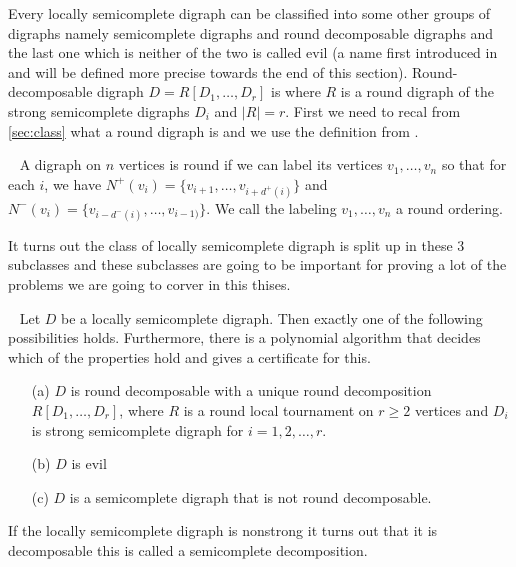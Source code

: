 
Every locally semicomplete digraph can be classified into some other groups of digraphs namely semicomplete digraphs and round decomposable digraphs and the last one which is neither of the two is called evil (a name first introduced in \cite{bangJGT85} and will be defined more precise towards the end of this section). 
Round-decomposable digraph $D=R[D_1,\dots,D_r]$ is where $R$ is a round digraph of the strong semicomplete digraphs $D_i$ and $|R|=r$.
First we need to recal from \autoref{sec:class} what a round digraph is and we use the definition from \cite{bangJGT77}.
\begin{definition}~\cite{bangJGT77}
    A digraph on $n$ vertices is round if we can label its vertices $v_1,\dots ,v_n$ so that for each $i$, we have $N^+(v_i)=\lbrace v_{i+1},\dots ,v_{i+d^+(i)}\rbrace$ and $N^-(v_i)=\lbrace v_{i-d^-(i)},\dots ,v_{i-1)}\rbrace$. We call the labeling $v_1,\dots ,v_n$ a round ordering. 
\end{definition}
It turns out the class of locally semicomplete digraph is split up in these 3 subclasses and these subclasses are going to be important for proving a lot of the problems we are going to corver in this thises.
\begin{thm}~\cite{bangDM167,bangJGT85}
    Let $D$ be a locally semicomplete digraph. Then exactly one of the following possibilities holds. Furthermore, there is a polynomial algorithm that decides which of the properties hold and gives a certificate for this.
    \begin{itemize}
        \item[(a)] $D$ is round decomposable with a unique round decomposition $R[D_1,\dots ,D_r]$, where $R$ is a round local tournament on $r\geq 2$ vertices and $D_i$ is strong semicomplete digraph for $i=1,2,\dots,r$.
        \item[(b)] $D$ is evil 
        \item[(c)] $D$ is a semicomplete digraph that is not round decomposable. 
    \end{itemize}
    \label{thm:treesubclasses}
\end{thm}
If the locally semicomplete digraph is nonstrong it turns out that it is decomposable this is called a semicomplete decomposition. 
